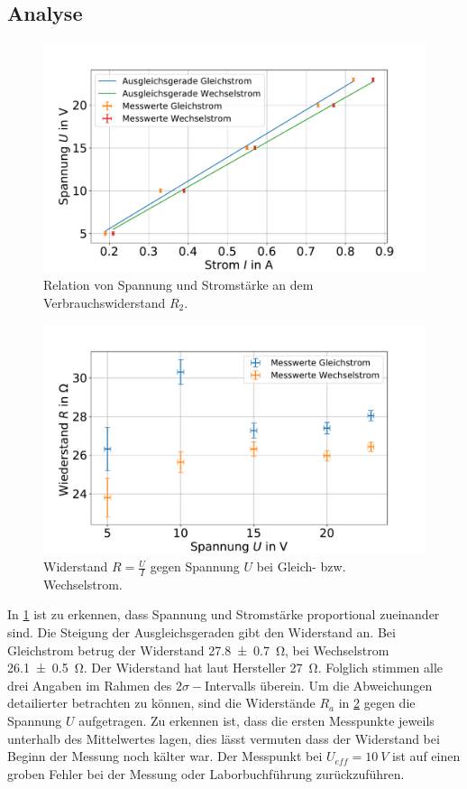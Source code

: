 \subsection{Analyse} 



\begin{figure}[h]
	\centering
	\includegraphics[width=0.9\linewidth]{"auswertung/Auswertung Innenwiderstand/Widerstand R2 B"}
	\caption{Relation von Spannung und Stromstärke an dem Verbrauchswiderstand $R_2$.}
	\label{fig:widerstand-r2}
\end{figure}



\begin{figure}
	\centering
	\includegraphics[width=0.9\linewidth]{"auswertung/Auswertung Innenwiderstand/WiderstandR2 A"}
	\caption{Widerstand $R=\frac{U}{I}$ gegen Spannung $U$ bei Gleich- bzw. Wechselstrom.}
	\label{fig:widerstandr2-a}
\end{figure}


In \cref{fig:widerstand-r2} ist zu erkennen, dass Spannung und Stromstärke proportional zueinander sind. Die Steigung der Ausgleichsgeraden gibt den Widerstand an. Bei Gleichstrom betrug der Widerstand \SI{27.8+-0.7}{\ohm}, bei Wechselstrom \SI{26.1+- 0.5}{\ohm}. Der Widerstand hat laut Hersteller \SI{27}{\ohm}. Folglich stimmen alle drei Angaben im Rahmen des $2\sigma-$Intervalls überein. Um die Abweichungen detailierter betrachten zu können, sind die Widerstände $R_a$ in \cref{fig:widerstandr2-a} gegen die Spannung $U$ aufgetragen. Zu erkennen ist, dass die ersten Messpunkte jeweils unterhalb des Mittelwertes lagen, dies lässt vermuten dass der Widerstand bei Beginn der Messung noch kälter war. Der Messpunkt bei  $U_{eff}= \SI{10}{V}$ ist auf einen groben Fehler bei der Messung oder Laborbuchführung zurückzuführen.\\



